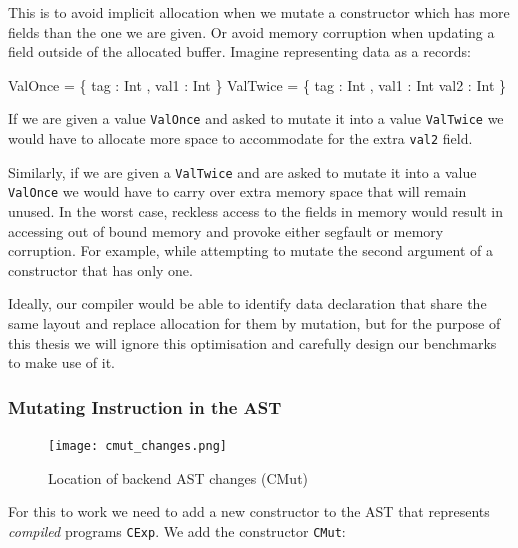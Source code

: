 \documentclass[
]{article}
\newenvironment{Shaded}{}{}
\newcommand{\DataTypeTok}[1]{\textcolor[rgb]{0.56,0.13,0.00}{#1}}
\newcommand{\NormalTok}[1]{#1}
\newcommand{\OperatorTok}[1]{\textcolor[rgb]{0.40,0.40,0.40}{#1}}
\newcommand{\OtherTok}[1]{\textcolor[rgb]{0.00,0.44,0.13}{#1}}
\begin{document}
This is to avoid implicit allocation when we mutate a constructor which
has more fields than the one we are given. Or avoid memory corruption
when updating a field outside of the allocated buffer. Imagine
representing data as a records:

\begin{Shaded}
\begin{Highlighting}[]
\DataTypeTok{ValOnce} \OtherTok{=}\NormalTok{ \{ tag }\OperatorTok{:} \DataTypeTok{Int}\NormalTok{ , val1 }\OperatorTok{:} \DataTypeTok{Int}\NormalTok{ \}}
\DataTypeTok{ValTwice} \OtherTok{=}\NormalTok{ \{ tag }\OperatorTok{:} \DataTypeTok{Int}\NormalTok{ , val1 }\OperatorTok{:} \DataTypeTok{Int}\NormalTok{ val2 }\OperatorTok{:} \DataTypeTok{Int}\NormalTok{ \}}
\end{Highlighting}
\end{Shaded}

If we are given a value \texttt{ValOnce} and asked to mutate it into a
value \texttt{ValTwice} we would have to allocate more space to
accommodate for the extra \texttt{val2} field.

Similarly, if we are given a \texttt{ValTwice} and are asked to mutate
it into a value \texttt{ValOnce} we would have to carry over extra
memory space that will remain unused. In the worst case, reckless access
to the fields in memory would result in accessing out of bound memory
and provoke either segfault or memory corruption. For example, while
attempting to mutate the second argument of a constructor that has only
one.

Ideally, our compiler would be able to identify data declaration that
share the same layout and replace allocation for them by mutation, but
for the purpose of this thesis we will ignore this optimisation and
carefully design our benchmarks to make use of it.

\hypertarget{mutating-instruction-in-the-ast}{%
\subsubsection{Mutating Instruction in the
AST}\label{mutating-instruction-in-the-ast}}

\begin{figure}
\centering
\texttt{[image: cmut\_changes.png]}
\caption{Location of backend AST changes (CMut)}
\end{figure}

For this to work we need to add a new constructor to the AST that
represents \emph{compiled} programs \texttt{CExp}. We add the
constructor \texttt{CMut}:
\end{document}
